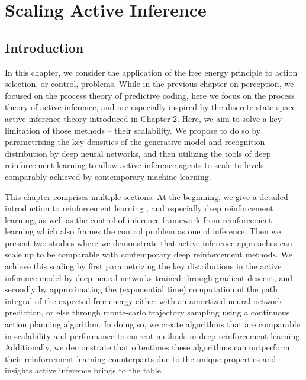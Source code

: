 \chapter{Scaling Active Inference}

\section{Introduction}

In this chapter, we consider the application of the free energy principle to action selection, or control, problems. While in the previous chapter on perception, we focused on the process theory of predictive coding, here we focus on the process theory of active inference, and are especially inspired by the discrete state-space active inference theory introduced in Chapter 2. Here, we aim to solve a key limitation of those methods -- their scalability. We propose to do so by parametrizing the key densities of the generative model and recognition distribution by deep neural networks, and then utilizing the tools of deep reinforcement learning to allow active inference agents to scale to levels comparably achieved by contemporary machine learning.

This chapter comprises multiple sections. At the beginning, we give a detailed introduction to reinforcement learning \citep{sutton2018reinforcement}, and especially deep reinforcement learning, as well as the control of inference framework \citep{rawlik2013probabilistic,levine2018reinforcement} from reinforcement learning which also frames the control problem as one of inference. Then we present two studies where we demonstrate that active inference approaches can scale up to be comparable with contemporary deep reinforcement methods. We achieve this scaling by first parametrizing the key distributions in the active inference model by deep neural networks trained through gradient descent, and secondly by approximating the (exponential time) computation of the path integral of the expected free energy either with an amortized neural network prediction, or else through monte-carlo trajectory sampling using a continuous action planning algorithm. In doing so, we create algorithms that are comparable in scalability and performance to current methods in deep reinforcement learning. Additionally, we demonstrate that oftentimes these algorithms can outperform their reinforcement learning counterparts due to the unique properties and insights active inference brings to the table.

